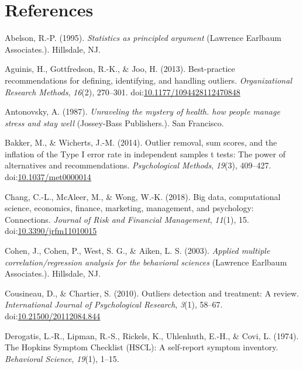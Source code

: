 \documentclass[man,floatsintext]{apa6}
\begin{document}
\newpage

\section{References}\label{references}

\setlength{\parindent}{-0.5in} \setlength{\leftskip}{0.5in}

\hypertarget{refs}{}
\hypertarget{ref-Abelson_1995}{}
Abelson, R.-P. (1995). \emph{Statistics as principled argument}
(Lawrence Earlbaum Associates.). Hillsdale, NJ.

\hypertarget{ref-Aguinis_et_al_2013}{}
Aguinis, H., Gottfredson, R.-K., \& Joo, H. (2013). Best-practice
recommendations for defining, identifying, and handling outliers.
\emph{Organizational Research Methods}, \emph{16}(2), 270--301.
doi:\href{https://doi.org/10.1177/1094428112470848}{10.1177/1094428112470848}

\hypertarget{ref-Antonovsky_1987}{}
Antonovsky, A. (1987). \emph{Unraveling the mystery of health. how
people manage stress and stay well} (Jossey-Bass Publishers.). San
Francisco.

\hypertarget{ref-Bakker_and_Wicherts_2014}{}
Bakker, M., \& Wicherts, J.-M. (2014). Outlier removal, sum scores, and
the inflation of the Type I error rate in independent samples t tests:
The power of alternatives and recommendations. \emph{Psychological
Methods}, \emph{19}(3), 409--427.
doi:\href{https://doi.org/10.1037/met0000014}{10.1037/met0000014}

\hypertarget{ref-Chang_et_al_2018}{}
Chang, C.-L., McAleer, M., \& Wong, W.-K. (2018). Big data,
computational science, economics, finance, marketing, management, and
psychology: Connections. \emph{Journal of Risk and Financial
Management}, \emph{11}(1), 15.
doi:\href{https://doi.org/10.3390/jrfm11010015}{10.3390/jrfm11010015}

\hypertarget{ref-Cohen_et_al_2003}{}
Cohen, J., Cohen, P., West, S. G., \& Aiken, L. S. (2003). \emph{Applied
multiple correlation/regression analysis for the behavioral sciences}
(Lawrence Earlbaum Associates.). Hillsdale, NJ.

\hypertarget{ref-Cousineau_Chartier_2010}{}
Cousineau, D., \& Chartier, S. (2010). Outliers detection and treatment:
A review. \emph{International Journal of Psychological Research},
\emph{3}(1), 58--67.
doi:\href{https://doi.org/10.21500/20112084.844}{10.21500/20112084.844}

\hypertarget{ref-Derogatis_et_al_1974}{}
Derogatis, L.-R., Lipman, R.-S., Rickels, K., Uhlenhuth, E.-H., \& Covi,
L. (1974). The Hopkins Symptom Checklist (HSCL): A self‐report symptom
inventory. \emph{Behavioral Science}, \emph{19}(1), 1--15.
\end{document}
